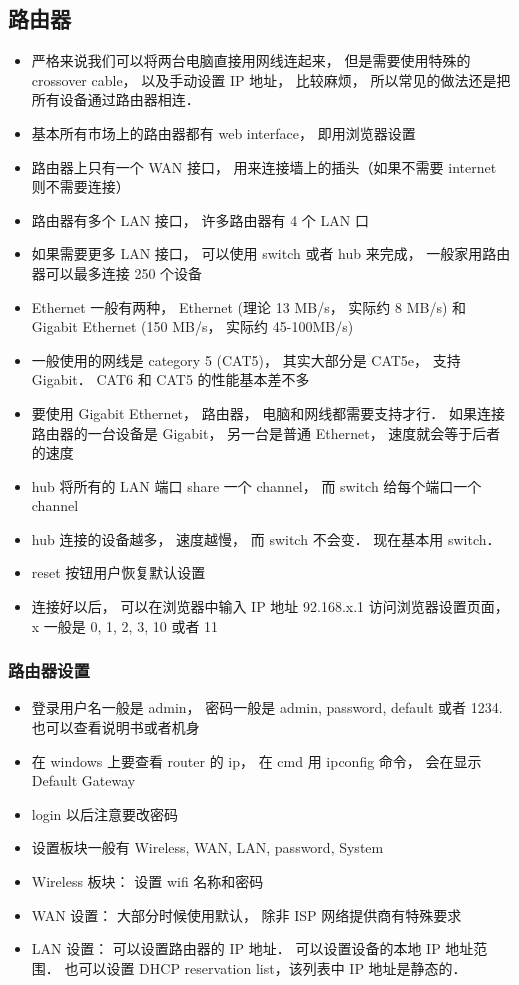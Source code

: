 \subsection{路由器}
\begin{itemize}
\item 严格来说我们可以将两台电脑直接用网线连起来， 但是需要使用特殊的 crossover cable， 以及手动设置 IP 地址， 比较麻烦， 所以常见的做法还是把所有设备通过路由器相连．
\item 基本所有市场上的路由器都有 web interface， 即用浏览器设置
\item 路由器上只有一个 WAN 接口， 用来连接墙上的插头（如果不需要 internet 则不需要连接）
\item 路由器有多个 LAN 接口， 许多路由器有 4 个 LAN 口
\item 如果需要更多 LAN 接口， 可以使用 switch 或者 hub 来完成， 一般家用路由器可以最多连接 250 个设备
\item Ethernet 一般有两种， Ethernet (理论 13 MB/s， 实际约 8 MB/s) 和 Gigabit Ethernet (150 MB/s， 实际约 45-100MB/s)
\item 一般使用的网线是 category 5 (CAT5)， 其实大部分是 CAT5e， 支持 Gigabit． CAT6 和 CAT5 的性能基本差不多
\item 要使用 Gigabit Ethernet， 路由器， 电脑和网线都需要支持才行． 如果连接路由器的一台设备是 Gigabit， 另一台是普通 Ethernet， 速度就会等于后者的速度
\item hub 将所有的 LAN 端口 share 一个 channel， 而 switch 给每个端口一个 channel
\item hub 连接的设备越多， 速度越慢， 而 switch 不会变． 现在基本用 switch．
\item reset 按钮用户恢复默认设置
\item 连接好以后， 可以在浏览器中输入 IP 地址 92.168.x.1 访问浏览器设置页面， x 一般是 0, 1, 2, 3, 10 或者 11
\end{itemize}

\subsubsection{路由器设置}
\begin{itemize}
\item 登录用户名一般是 admin， 密码一般是 admin, password, default 或者 1234. 也可以查看说明书或者机身
\item 在 windows 上要查看 router 的 ip， 在 cmd 用 ipconfig 命令， 会在显示 Default Gateway
\item login 以后注意要改密码
\item 设置板块一般有 Wireless, WAN, LAN, password, System
\item Wireless 板块： 设置 wifi 名称和密码
\item WAN 设置： 大部分时候使用默认， 除非 ISP 网络提供商有特殊要求
\item LAN 设置： 可以设置路由器的 IP 地址． 可以设置设备的本地 IP 地址范围． 也可以设置 DHCP reservation list，该列表中 IP 地址是静态的． 
\end{itemize}
